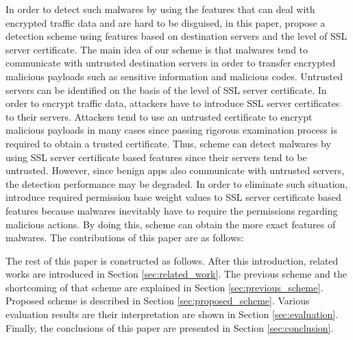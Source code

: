 In order to detect such malwares by using the features that can deal with encrypted traffic data and are hard to be disguised, in this paper, \we propose a detection scheme using features based on destination servers and the level of SSL server certificate.
The main idea of our scheme is that malwares tend to communicate with untrusted destination servers in order to transfer encrypted malicious payloads such as sensitive information and malicious codes.
Untrusted servers can be identified on the basis of the level of SSL server certificate.
In order to encrypt traffic data, attackers have to introduce SSL server certificates to their servers.
Attackers tend to use an untrusted certificate to encrypt malicious payloads in many cases since passing rigorous examination process is required to obtain a trusted certificate.
Thus, \our scheme can detect malwares by using SSL server certificate based features since their servers tend to be untrusted.
However, since benign apps also communicate with untrusted servers, the detection performance may be degraded.
In order to eliminate such situation, \we introduce required permission base weight values to SSL server certificate based features because malwares inevitably have to require the permissions regarding malicious actions.
By doing this, \our scheme can obtain the more exact features of malwares. 
The contributions of this paper are as follows: 

The rest of this paper is constructed as follows. 
After this introduction, related works are introduced in Section \ref{sec:related_work}.
The previous scheme and the shortcoming of that scheme are explained in Section \ref{sec:previous_scheme}.
Proposed scheme is described in Section \ref{sec:proposed_scheme}.
Various evaluation results are their interpretation are shown in Section \ref{sec:evaluation}.
Finally, the conclusions of this paper are presented in Section \ref{sec:conclusion}.

